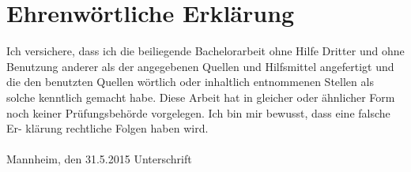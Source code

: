 \documentclass[11pt,titlepage,oneside,openany,a4paper]{report}
\begin{document}
\newpage

\pagestyle{empty}


\section*{Ehrenw\"ortliche Erkl\"arung}
Ich versichere, dass ich die beiliegende Bachelorarbeit ohne Hilfe Dritter
und ohne Benutzung anderer als der angegebenen Quellen und Hilfsmittel
angefertigt und die den benutzten Quellen w\"ortlich oder inhaltlich
entnommenen Stellen als solche kenntlich gemacht habe. Diese Arbeit
hat in gleicher oder \"ahnlicher Form noch keiner Pr\"ufungsbeh\"orde
vorgelegen. Ich bin mir bewusst, dass eine falsche Er- kl\"arung rechtliche Folgen haben
wird.
\\
\\

\noindent
Mannheim, den 31.5.2015 \hspace{4cm} Unterschrift
\end{document}
